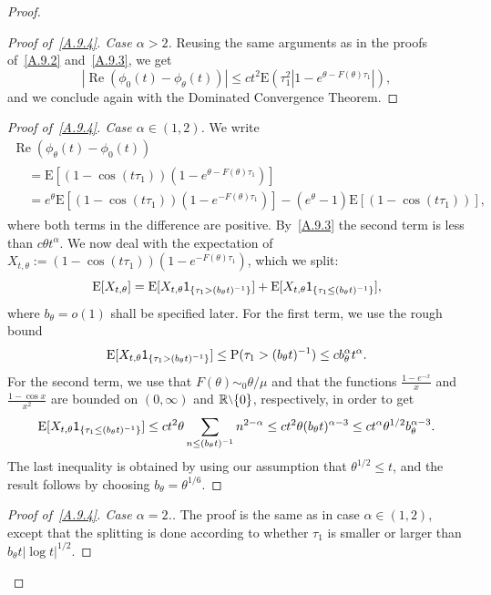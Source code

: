 \documentclass[10pt]{amsart}
\theoremstyle{definition}\newtheorem{defi}[theo]{Definition}\newtheorem{rema}[theo]{Remark}\newtheorem{exam}[theo]{Example}\newtheorem{exem}[theo]{Example}\newtheorem{nota}[theo]{Notation}
\DeclareMathOperator{\re}{Re}
\newcommand{\bbR}{{\ensuremath{\mathbb R}}}
\newcommand{\ga}{\alpha}
\newcommand{\gt}{\theta}
\newcommand\bP{\ensuremath{\mathrm{P}}}
\newcommand\bE{\ensuremath{\mathrm{E}}}
\newcommand{\ind}{{\sf 1}}
\newcommand{\sm}{{\raise0.3ex\hbox{$\scriptstyle \setminus$}}}
\newenvironment{step}[1]{\begin{proof}[{#1}]}{\let\qed\relax \end{proof}}
\newenvironment{laststep}[1]{\begin{proof}[{#1}]}{\end{proof}}
\begin{document}
\begin{proof}
\begin{step}{Proof of~\eqref{A.9.4}. Case $\ga >2$}
Reusing the same arguments as in the proofs of~\eqref{A.9.2} and~\eqref{A.9.3}, we get
\begin{equation}
| \re(\phi_0(t) -\phi_\gt(t)) | \le ct^2 \bE(\tau_1^2|1-e^{\gt - F(\gt)\tau_1}|),
\end{equation}
and we conclude again with the Dominated Convergence Theorem.
\end{step}

\begin{step}{Proof of~\eqref{A.9.4}. Case $\ga \in (1,2)$}
We write
\begin{multline}
\re (\phi_\gt(t) - \phi_0(t))\\
\begin{aligned}
&= \bE[(1-\cos(t\tau_1)) (1-e^{\gt -F(\gt)\tau_1})]\\
& = e^{\gt}\bE[(1-\cos(t\tau_1)) (1-e^{-F(\gt)\tau_1})] - (e^\gt - 1)\bE[(1-\cos(t\tau_1))],
\end{aligned}
\end{multline}
where both terms in the difference are positive. By~\eqref{A.9.3} the second term is less than $c\gt t^\ga$. We now deal with the expectation of $X_{t,\gt} := (1-\cos(t\tau_1)) (1-e^{-F(\gt)\tau_1})$, which we split:
\begin{equation}
\bE[X_{t,\gt}] = \bE[X_{t,\gt} \ind_{\{\tau_1 > (b_\gt t)^{-1}\}}] + \bE[X_{t,\gt} \ind_{\{\tau_1 \le (b_\gt t)^{-1}\}}],
\end{equation}
where $b_\gt = o(1)$ shall be specified later. For the first term, we use the rough bound
\begin{equation}
\bE[X_{t,\gt} \ind_{\{\tau_1 > (b_\gt t)^{-1}\}}] \le \bP(\tau_1 > (b_\gt t)^{-1}) \le c b_\gt^\ga t^\ga.
\end{equation}
For the second term, we use that $F(\theta)\sim_0 \gt/\mu$ and that the functions $\frac{1-e^{-x}}{x}$ and $\frac{1-\cos x}{x^2}$ are bounded on $(0,\infty)$ and $\bbR\sm\{0\}$, respectively, in order to get
\begin{equation}
\bE[X_{t,\gt} \ind_{\{\tau_1\le (b_\gt t)^{-1}\}}]
\le c t^2 \gt \sum_{n\le (b_\gt t)^{-1}} n^{2-\ga}
\le ct^2\gt (b_\gt t)^{\ga - 3} \le c t^\ga \gt^{1/2}b_\gt^{\ga-3}.
\end{equation}
The last inequality is obtained by using our assumption that $\gt^{1/2} \le t$, and the result follows by choosing $b_\gt = \gt^{1/6}$.
\end{step}

\begin{laststep}{Proof of~\eqref{A.9.4}. Case $\ga =2$.} The proof is the same as in case $\ga \in(1,2)$, except that the splitting is done according to whether $\tau_1$ is smaller or larger than $b_\gt t |{\log t}|^{1/2}$.
\end{laststep}
\let\qed\relax
\end{proof}
\end{document}
